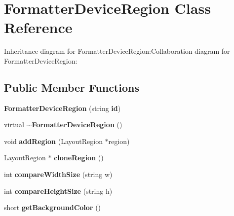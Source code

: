 \section{FormatterDeviceRegion Class Reference}
\label{classbr_1_1pucrio_1_1telemidia_1_1ginga_1_1ncl_1_1model_1_1presentation_1_1FormatterDeviceRegion}
Inheritance diagram for FormatterDeviceRegion:Collaboration diagram for FormatterDeviceRegion:\subsection*{Public Member Functions}
\begin{CompactItemize}
\item 
\textbf{FormatterDeviceRegion} (string {\bf id})\label{classbr_1_1pucrio_1_1telemidia_1_1ginga_1_1ncl_1_1model_1_1presentation_1_1FormatterDeviceRegion_4b5af5ececc8b2952b71288da323210f}

\item 
virtual {\bf $\sim$FormatterDeviceRegion} ()\label{classbr_1_1pucrio_1_1telemidia_1_1ginga_1_1ncl_1_1model_1_1presentation_1_1FormatterDeviceRegion_7aaf2bb7413c1ecbe3022540b890c810}

\item 
void \textbf{addRegion} (LayoutRegion $\ast$region)\label{classbr_1_1pucrio_1_1telemidia_1_1ginga_1_1ncl_1_1model_1_1presentation_1_1FormatterDeviceRegion_8aad7239b8d80c84adeee998f393884a}

\item 
LayoutRegion $\ast$ \textbf{cloneRegion} ()\label{classbr_1_1pucrio_1_1telemidia_1_1ginga_1_1ncl_1_1model_1_1presentation_1_1FormatterDeviceRegion_d3192fead9c23ac45348df98b974eeee}

\item 
int \textbf{compareWidthSize} (string w)\label{classbr_1_1pucrio_1_1telemidia_1_1ginga_1_1ncl_1_1model_1_1presentation_1_1FormatterDeviceRegion_b165837d6b4531856c9f09ed0cd05a1a}

\item 
int \textbf{compareHeightSize} (string h)\label{classbr_1_1pucrio_1_1telemidia_1_1ginga_1_1ncl_1_1model_1_1presentation_1_1FormatterDeviceRegion_1ba5b192c46a528cf4e8c1d4a383507b}

\item 
short \textbf{getBackgroundColor} ()\label{classbr_1_1pucrio_1_1telemidia_1_1ginga_1_1ncl_1_1model_1_1presentation_1_1FormatterDeviceRegion_8faf45d504e0302b2de8a2cc6e7d492d}


\end{CompactItemize}
